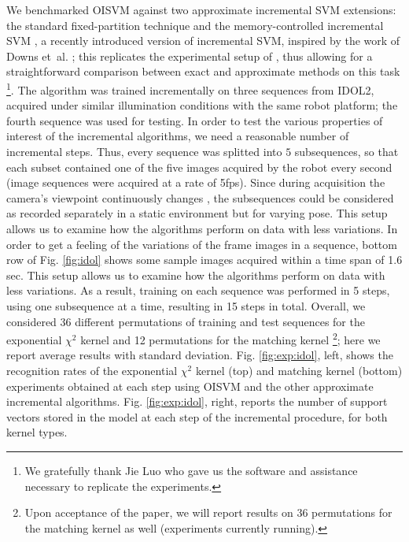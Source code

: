 We benchmarked OISVM against two approximate incremental SVM
extensions: the standard fixed-partition technique
\cite{syed99incremental} and the memory-controlled incremental SVM
\cite{pronobis:icvs06}, a recently introduced version of incremental SVM,
inspired by the work of Downs et~al. \cite{DownsGM01}; this replicates
the experimental setup of \cite{luo:icra07}, thus allowing for a
straightforward comparison between exact and approximate methods on
this task
\footnote{We gratefully thank Jie Luo who gave us the software and assistance 
necessary to replicate the experiments.}.  
The algorithm was trained incrementally on three sequences
from IDOL2, acquired under similar illumination conditions with the
same robot platform; the fourth sequence was used for testing. In
order to test the various properties of interest of the incremental
algorithms, we need a reasonable number of incremental steps.  Thus,
every sequence was splitted into $5$ subsequences, so that each subset
contained one of the five images acquired by the robot every second
(image sequences were acquired at a rate of 5fps). Since during
acquisition the camera's viewpoint continuously changes
\cite{luo:icra07}, the subsequences could be considered as recorded
separately in a static environment but for varying pose.  This setup
allows us to examine how the algorithms perform on data with less
variations. In order to get a feeling of the variations of the frame
images in a sequence, bottom row of Fig. \ref{fig:idol} shows some
sample images acquired within a time span of 1.6 sec. This setup
allows us to examine how the algorithms perform on data with less
variations. As a result, training on each sequence was performed in 5
steps, using one subsequence at a time, resulting in 15 steps in
total. Overall, we considered 36 different permutations of training
and test sequences for the exponential $\chi^2$ kernel and 12
permutations for the matching kernel \footnote{Upon acceptance of the
paper, we will report results on 36 permutations for the matching
kernel as well (experiments currently running).}; here we report
average results with standard deviation. Fig. \ref{fig:exp:idol},
left, shows the recognition rates of the exponential $\chi^2$ kernel
(top) and matching kernel (bottom) experiments obtained at each step
using OISVM and the other approximate incremental
algorithms. Fig. \ref{fig:exp:idol}, right, reports the number of
support vectors stored in the model at each step of the incremental
procedure, for both kernel types.

